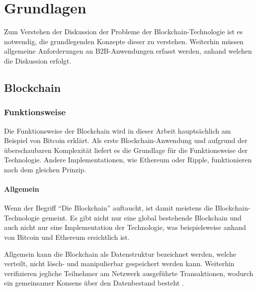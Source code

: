 \chapter{Grundlagen}
\label{cha:grundlagen}
Zum Verstehen der Diskussion der Probleme der Blockchain-Technologie ist es notwendig, die grundlegenden Konzepte dieser zu verstehen. Weiterhin müssen allgemeine Anforderungen an B2B-Anwendungen erfasst werden, anhand welchen die Diskussion erfolgt.

\section{Blockchain}

\subsection{Funktionsweise}
Die Funktionsweise der Blockchain wird in dieser Arbeit hauptsächlich am Beispiel von Bitcoin erklärt. Als erste Blockchain-Anwendung \cite{ZhengBlockchainChallengesOpportunities2017} und aufgrund der überschaubaren Komplexität liefert es die Grundlage für die Funktionsweise der Technologie. Andere Implementationen, wie Ethereum oder Ripple, funktionieren nach dem gleichen Prinzip.

\subsubsection{Allgemein}
Wenn der Begriff ``Die Blockchain'' auftaucht, ist damit meistens die Blockchain-Technologie gemeint. Es gibt nicht nur eine global bestehende Blockchain und auch nicht nur eine Implementation der Technologie, was beispielsweise anhand von Bitcoin und Ethereum ersichtlich ist.

Allgemein kann die Blockchain als Datenstruktur bezeichnet werden, welche verteilt, nicht lösch- und manipulierbar gespeichert werden kann. Weiterhin verifizieren jegliche Teilnehmer am Netzwerk ausgeführte Transaktionen, wodurch ein gemeinsamer Konsens über den Datenbestand besteht \cite{CrosbyBlockChainTechnologyBitcoin2016}.

